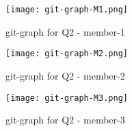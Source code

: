 \documentclass[a4paper]{article} %
\begin{document}
 
\begin{figure}
	\centering
	\texttt{[image: git-graph-M1.png]}
	\caption{git-graph for Q2 - member-1} 
	
\end{figure}
\begin{figure}
	\centering
	\texttt{[image: git-graph-M2.png]}
	\caption{git-graph for Q2 - member-2} 
	
\end{figure}
\begin{figure}
	\centering
	\texttt{[image: git-graph-M3.png]}
	\caption{git-graph for Q2 - member-3} 
	
\end{figure}


 
\end{document}
